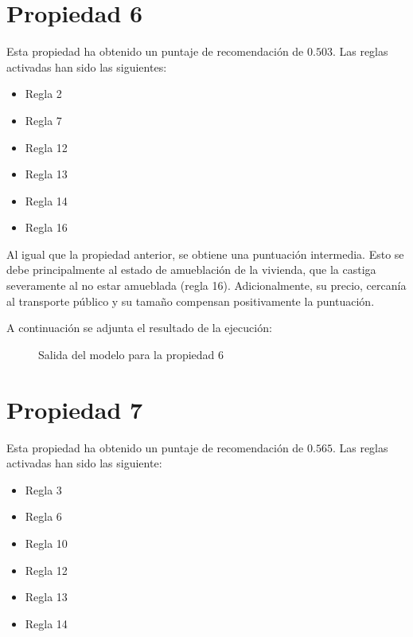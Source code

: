\documentclass[12pt]{report} %
\begin{document}
    \section{Propiedad 6}
    Esta propiedad ha obtenido un puntaje de recomendación de $0.503$. Las
    reglas activadas han sido las siguientes: 
    \begin{itemize}
        \item Regla 2
        \item Regla 7
        \item Regla 12
        \item Regla 13
        \item Regla 14
        \item Regla 16
    \end{itemize}

    Al igual que la propiedad anterior, se obtiene una puntuación intermedia.
    Esto se debe principalmente al estado de amueblación de la vivienda, que la
    castiga severamente al no estar amueblada (regla 16). Adicionalmente, su
    precio, cercanía al transporte público y su tamaño compensan positivamente
    la puntuación.

    A continuación se adjunta el resultado de la ejecución:
    \begin{figure}[H]
        \centering
        \caption{Salida del modelo para la propiedad 6}
    \end{figure}

    \section{Propiedad 7}
    Esta propiedad ha obtenido un puntaje de recomendación de $0.565$. Las
    reglas activadas han sido las siguiente:
    \begin{itemize}
        \item Regla 3
        \item Regla 6
        \item Regla 10
        \item Regla 12
        \item Regla 13
        \item Regla 14
    \end{itemize}
\end{document}
